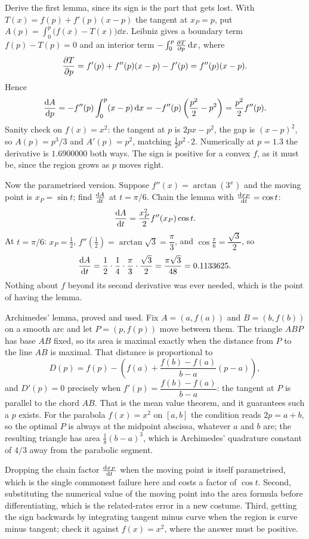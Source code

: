 \begin{worked}
Derive the first lemma, since its sign is the part that gets lost. With $T(x)=f(p)+f'(p)(x-p)$ the tangent at $x_{P}=p$, put $A(p)=\int_{0}^{p}\bigl(f(x)-T(x)\bigr)\dd x$. Leibniz gives a boundary term $f(p)-T(p)=0$ and an interior term $-\int_{0}^{p}\frac{\partial T}{\partial p}\,\mathrm{d} x$, where
\[
\frac{\partial T}{\partial p}=f'(p)+f''(p)(x-p)-f'(p)=f''(p)(x-p).
\]
Hence
\[
\frac{\mathrm{d}A}{\mathrm{d}p}=-f''(p)\int_{0}^{p}(x-p)\,\mathrm{d} x=-f''(p)\left(\frac{p^{2}}{2}-p^{2}\right)=\frac{p^{2}}{2}f''(p).
\]
Sanity check on $f(x)=x^{2}$: the tangent at $p$ is $2px-p^{2}$, the gap is $(x-p)^{2}$, so $A(p)=p^{3}/3$ and $A'(p)=p^{2}$, matching $\tfrac12p^{2}\cdot2$. Numerically at $p=1.3$ the derivative is $1.6900000$ both ways. The sign is positive for a convex $f$, as it must be, since the region grows as $p$ moves right.

Now the parametrised version. Suppose $f''(x)=\arctan(3^{x})$ and the moving point is $x_{P}=\sin t$; find $\frac{\mathrm{d}A}{\mathrm{d}t}$ at $t=\pi/6$. Chain the lemma with $\frac{\mathrm{d}x_{P}}{\mathrm{d}t}=\cos t$:
\[
\frac{\mathrm{d}A}{\mathrm{d}t}=\frac{x_{P}^{2}}{2}f''(x_{P})\cos t .
\]
At $t=\pi/6$: $x_{P}=\tfrac12$, $f''(\tfrac12)=\arctan\sqrt3=\dfrac\pi3$, and $\cos\tfrac\pi6=\dfrac{\sqrt3}{2}$, so
\[
\frac{\mathrm{d}A}{\mathrm{d}t}=\frac12\cdot\frac14\cdot\frac\pi3\cdot\frac{\sqrt3}{2}=\frac{\pi\sqrt3}{48}=0.1133625 .
\]
Nothing about $f$ beyond its second derivative was ever needed, which is the point of having the lemma.

Archimedes' lemma, proved and used. Fix $A=(a,f(a))$ and $B=(b,f(b))$ on a smooth arc and let $P=(p,f(p))$ move between them. The triangle $ABP$ has base $AB$ fixed, so its area is maximal exactly when the distance from $P$ to the line $AB$ is maximal. That distance is proportional to
\[
D(p)=f(p)-\left(f(a)+\frac{f(b)-f(a)}{b-a}(p-a)\right),
\]
and $D'(p)=0$ precisely when $f'(p)=\dfrac{f(b)-f(a)}{b-a}$: the tangent at $P$ is parallel to the chord $AB$. That is the mean value theorem, and it guarantees such a $p$ exists. For the parabola $f(x)=x^{2}$ on $[a,b]$ the condition reads $2p=a+b$, so the optimal $P$ is always at the midpoint abscissa, whatever $a$ and $b$ are; the resulting triangle has area $\tfrac18(b-a)^{3}$, which is Archimedes' quadrature constant of $4/3$ away from the parabolic segment.
\end{worked}

\begin{trap}
Dropping the chain factor $\frac{\mathrm{d}x_{P}}{\mathrm{d}t}$ when the moving point is itself parametrised, which is the single commonest failure here and costs a factor of $\cos t$. Second, substituting the numerical value of the moving point into the area formula before differentiating, which is the related-rates error in a new costume. Third, getting the sign backwards by integrating tangent minus curve when the region is curve minus tangent; check it against $f(x)=x^{2}$, where the answer must be positive.
\end{trap}

